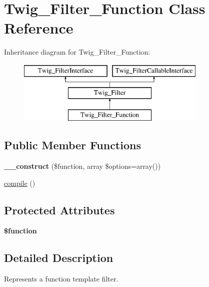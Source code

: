 \hypertarget{class_twig___filter___function}{}\section{Twig\+\_\+\+Filter\+\_\+\+Function Class Reference}
\label{class_twig___filter___function}
Inheritance diagram for Twig\+\_\+\+Filter\+\_\+\+Function\+:\begin{figure}[H]
\begin{center}
\leavevmode
\includegraphics[height=3.000000cm]{class_twig___filter___function}
\end{center}
\end{figure}
\subsection*{Public Member Functions}
\begin{DoxyCompactItemize}
\item 
\hypertarget{class_twig___filter___function_ae6ad9907bb7237c92e880ca6bfd16469}{}{\bfseries \+\_\+\+\_\+construct} (\$function, array \$options=array())\label{class_twig___filter___function_ae6ad9907bb7237c92e880ca6bfd16469}

\item 
\hyperlink{class_twig___filter___function_a3815e7c2e73f00c2ebffcf5b90eef3b1}{compile} ()
\end{DoxyCompactItemize}
\subsection*{Protected Attributes}
\begin{DoxyCompactItemize}
\item 
\hypertarget{class_twig___filter___function_af3e5d0d1ff43879d493dd97bb760c479}{}{\bfseries \$function}\label{class_twig___filter___function_af3e5d0d1ff43879d493dd97bb760c479}

\end{DoxyCompactItemize}


\subsection{Detailed Description}
Represents a function template filter.


